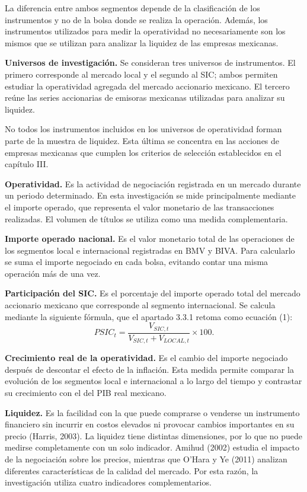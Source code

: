 La diferencia entre ambos segmentos depende de la clasificación de los instrumentos y no de la bolsa donde se realiza la operación. Además, los instrumentos utilizados para medir la operatividad no necesariamente son los mismos que se utilizan para analizar la liquidez de las empresas mexicanas.

\textbf{Universos de investigación.} Se consideran tres universos de instrumentos. El primero corresponde al mercado local y el segundo al SIC; ambos permiten estudiar la operatividad agregada del mercado accionario mexicano. El tercero reúne las series accionarias de emisoras mexicanas utilizadas para analizar su liquidez.

No todos los instrumentos incluidos en los universos de operatividad forman parte de la muestra de liquidez. Esta última se concentra en las acciones de empresas mexicanas que cumplen los criterios de selección establecidos en el capítulo III.

\textbf{Operatividad.} Es la actividad de negociación registrada en un mercado durante un periodo determinado. En esta investigación se mide principalmente mediante el importe operado, que representa el valor monetario de las transacciones realizadas. El volumen de títulos se utiliza como una medida complementaria.

\textbf{Importe operado nacional.} Es el valor monetario total de las operaciones de los segmentos local e internacional registradas en BMV y BIVA. Para calcularlo se suma el importe negociado en cada bolsa, evitando contar una misma operación más de una vez.

\textbf{Participación del SIC.} Es el porcentaje del importe operado total del mercado accionario mexicano que corresponde al segmento internacional. Se calcula mediante la siguiente fórmula, que el apartado 3.3.1 retoma como ecuación (1):
\[ PSIC_t = \frac{V_{SIC,t}}{V_{SIC,t}+V_{LOCAL,t}}\times 100. \]

\textbf{Crecimiento real de la operatividad.} Es el cambio del importe negociado después de descontar el efecto de la inflación. Esta medida permite comparar la evolución de los segmentos local e internacional a lo largo del tiempo y contrastar su crecimiento con el del PIB real mexicano.


\textbf{Liquidez.} Es la facilidad con la que puede comprarse o venderse un instrumento financiero sin incurrir en costos elevados ni provocar cambios importantes en su precio (Harris, 2003). La liquidez tiene distintas dimensiones, por lo que no puede medirse completamente con un solo indicador. Amihud (2002) estudia el impacto de la negociación sobre los precios, mientras que O'Hara y Ye (2011) analizan diferentes características de la calidad del mercado. Por esta razón, la investigación utiliza cuatro indicadores complementarios.

